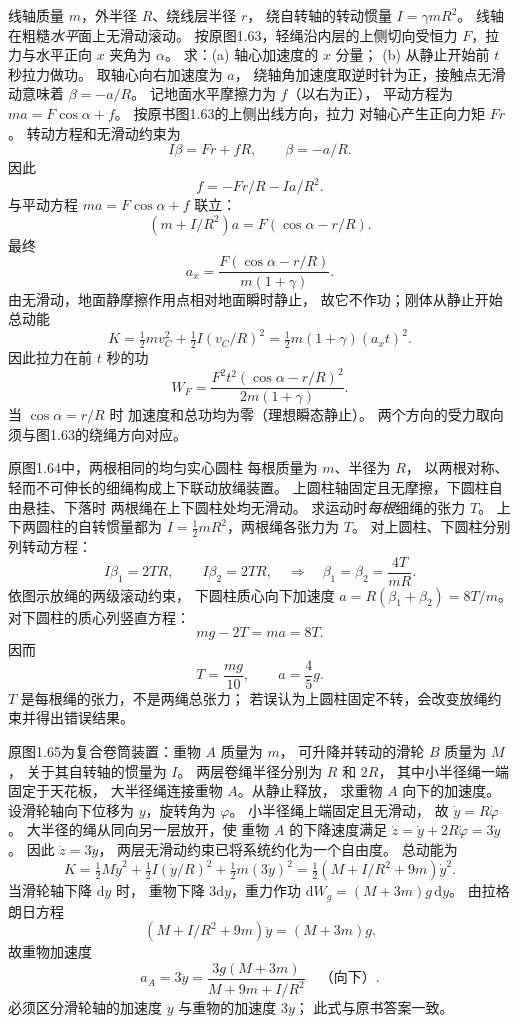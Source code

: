 线轴质量 $m$，外半径 $R$、绕线层半径 $r$，
绕自转轴的转动惯量
$I=\gamma mR^2$。
线轴在粗糙\emph{水平}面上无滑动滚动。
按原图1.63，轻绳沿内层的上侧切向受恒力
$F$，拉力与水平正向 $x$ 夹角为 $\alpha$。
求：(a) 轴心加速度的 $x$ 分量；
(b) 从静止开始前 $t$ 秒拉力做功。
\exsolution
取轴心向右加速度为 $a$，
绕轴角加速度取逆时针为正，接触点无滑动意味着
$\beta=-a/R$。
记地面水平摩擦力为 $f$（以右为正），
平动方程为
$m a=F\cos\alpha+f$。
按原书图1.63的上侧出线方向，拉力
对轴心产生正向力矩 $Fr$。
转动方程和无滑动约束为
\[
I\beta=Fr+fR,\qquad \beta=-a/R.
\]
因此
\[
f=-Fr/R-Ia/R^2.
\]
与平动方程 $ma=F\cos\alpha+f$ 联立：
\[
(m+I/R^2)a=F(\cos\alpha-r/R).
\]
最终
\[
\boxed{a_x=\frac{F(\cos\alpha-r/R)}{m(1+\gamma)}}.
\]
由无滑动，地面静摩擦作用点相对地面瞬时静止，
故它不作功；刚体从静止开始总动能
\[
K=\tfrac12mv_C^2+\tfrac12I(v_C/R)^2
=\tfrac12m(1+\gamma)(a_xt)^2.
\]
因此拉力在前 $t$ 秒的功
\[
\boxed{W_F=\frac{F^2t^2(\cos\alpha-r/R)^2}
{2m(1+\gamma)}}.
\]
\excheck 当 $\cos\alpha=r/R$ 时
加速度和总功均为零（理想瞬态静止）。
两个方向的受力取向须与图1.63的绕绳方向对应。

原图1.64中，两根相同的均匀实心圆柱
每根质量为 $m$、半径为 $R$，
以两根对称、轻而不可伸长的细绳构成上下联动放绳装置。
上圆柱轴固定且无摩擦，下圆柱自由悬挂、下落时
两根绳在上下圆柱处均无滑动。
求运动时\emph{每根}细绳的张力 $T$。
\exsolution
上下两圆柱的自转惯量都为
$I=\frac12mR^2$，两根绳各张力为 $T$。
对上圆柱、下圆柱分别列转动方程：
\[
I\beta_1=2TR,\qquad I\beta_2=2TR,
\quad\Longrightarrow\quad
\beta_1=\beta_2=\frac{4T}{mR}.
\]
依图示放绳的两级滚动约束，
下圆柱质心向下加速度
$a=R(\beta_1+\beta_2)=8T/m$。
对下圆柱的质心列竖直方程：
\[
mg-2T=ma=8T.
\]
因而
\[
\boxed{T=\frac{mg}{10}},
\qquad
\boxed{a=\frac45g}.
\]
\excheck $T$ 是每根绳的张力，不是两绳总张力；
若误认为上圆柱固定不转，会改变放绳约束并得出错误结果。

原图1.65为复合卷筒装置：重物 $A$ 质量为 $m$，
可升降并转动的滑轮 $B$ 质量为 $M$，
关于其自转轴的惯量为 $I$。
两层卷绳半径分别为 $R$ 和 $2R$，
其中小半径绳一端固定于天花板，
大半径绳连接重物 $A$。从静止释放，
求重物 $A$ 向下的加速度。
\exsolution
设滑轮轴向下位移为 $y$，旋转角为 $\varphi$。
小半径绳上端固定且无滑动，
故 $\dot y=R\dot\varphi$。
大半径的绳从同向另一层放开，使
重物 $A$ 的下降速度满足
$\dot z=\dot y+2R\dot\varphi=3\dot y$。
因此 $\ddot z=3\ddot y$，
两层无滑动约束已将系统约化为一个自由度。
总动能为
\[
K=\tfrac12M\dot y^2+
\tfrac12I(\dot y/R)^2+
\tfrac12m(3\dot y)^2
=\tfrac12(M+I/R^2+9m)\dot y^2.
\]
当滑轮轴下降 $\mathrm dy$ 时，
重物下降 $3\mathrm dy$，重力作功
$\mathrm dW_g=(M+3m)g\,\mathrm dy$。
由拉格朗日方程
\[
(M+I/R^2+9m)\ddot y=(M+3m)g.
\]
故重物加速度
\[
\boxed{a_A=3\ddot y
=\frac{3g(M+3m)}{M+9m+I/R^2}}
\quad\text{（向下）}.
\]
\excheck 必须区分滑轮轴的加速度 $\ddot y$
与重物的加速度 $3\ddot y$；
此式与原书答案一致。

